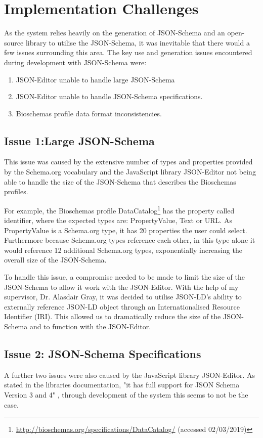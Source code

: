 \newpage
\section{Implementation Challenges}\label{sec:issues}
As the system relies heavily on the generation of JSON-Schema and an open-source library to utilise the JSON-Schema, it was inevitable that there would a few issues surrounding this area. The key use and generation issues encountered during development with JSON-Schema were:
\begin{enumerate}
  \item JSON-Editor unable to handle large JSON-Schema
  \item JSON-Editor unable to handle JSON-Schema specifications.
  \item Bioschemas profile data format inconsistencies.
\end{enumerate}

\subsection{Issue 1:Large JSON-Schema}
This issue was caused by the extensive number of types and properties provided by the Schema.org vocabulary and the JavaScript library JSON-Editor not being able to handle the size of the JSON-Schema that describes the Bioschemas profiles.

For example, the Bioschemas profile DataCatalog\footnote{\url{http://bioschemas.org/specifications/DataCatalog/} (accessed 02/03/2019)} has the property called identifier, where the expected types are: PropertyValue, Text or URL. As PropertyValue is a Schema.org type, it has 20 properties the user could select. Furthermore because Schema.org types reference each other, in this type alone it would reference 12 additional Schema.org types, exponentially increasing the overall size of the JSON-Schema.

To handle this issue, a compromise needed to be made to limit the size of the JSON-Schema to allow it work with the JSON-Editor. With the help of my supervisor, Dr. Alasdair Gray, it was decided to utilise JSON-LD's ability to externally reference JSON-LD object through an Internationalised Resource Identifier (IRI). This allowed us to dramatically reduce the size of the JSON-Schema and to function with the JSON-Editor.

\newpage
\subsection{Issue 2: JSON-Schema Specifications}
A further two issues were also caused by the JavaScript library JSON-Editor. As stated in the libraries documentation, "it has full support for JSON Schema Version 3 and 4" \cite{jsonEditor}, through development of the system this seems to not be the case.

